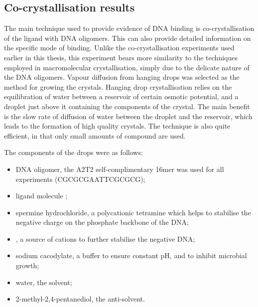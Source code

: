 \begin{refsection}

\subsection{Co-crystallisation results}
The main technique used to provide evidence of DNA binding is co-crystallisation of the ligand with DNA oligomers.
This can also provide detailed information on the specific mode of binding.
Unlike the co-crystallisation experiments used earlier in this thesis, this experiment bears more similarity to the techniques employed in macromolecular crystallisation, simply due to the delicate nature of the DNA oligomers.
Vapour diffusion from hanging drops was selected as the method for growing the crystals.
Hanging drop crystallisation relies on the equilibration of water between a reservoir of certain osmotic potential, and a droplet just above it containing the components of the crystal.
The main benefit is the slow rate of diffusion of water between the droplet and the reservoir, which leads to the formation of high quality crystals.
The technique is also quite efficient, in that only small amounts of compound are used.

The components of the drops were as follows:

\begin{itemize}
    \item DNA oligomer, the A2T2 self-complimentary 16mer was used for all experiments (CGCGCGAATTCGCGCG);
    \item ligand molecule ;
    \item spermine hydrochloride, a polycationic tetramine which helps to stabilise the negative charge on the phosphate backbone of the DNA;\@
    \item {}, a source of  cations to further stabilise the negative DNA;\@
    \item sodium cacodylate, a buffer to ensure constant pH, and to inhibit microbial growth;
    \item water, the solvent;
    \item 2-methyl-2,4-pentanediol, the anti-solvent.
\end{itemize}


\end{refsection}
